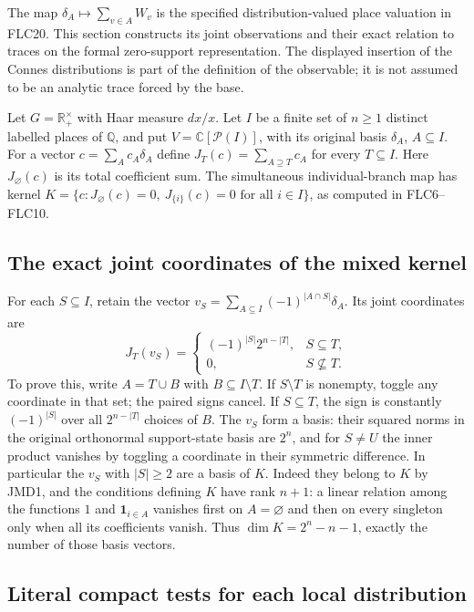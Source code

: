 \documentclass[11pt]{article}
\begin{document}
The map $\delta_A\mapsto\sum_{v\in A}W_v$ is the specified
distribution-valued place valuation in FLC20. This section constructs
its joint observations and their exact relation to traces on the
formal zero-support representation. The displayed insertion of the
Connes distributions is part of the definition of the observable;
it is not assumed to be an analytic trace forced by the base.

Let $G=\mathbb R_+^\times$ with Haar measure $dx/x$.
Let $I$ be a finite set of $n\ge1$ distinct labelled places of
$\mathbb Q$, and put $V=\mathbb C[\mathcal P(I)]$, with its
original basis $\delta_A$, $A\subseteq I$.
For a vector $c=\sum_A c_A\delta_A$ define
$J_T(c)=\sum_{A\supseteq T}c_A$ for every $T\subseteq I$.
Here $J_\varnothing(c)$ is its total coefficient sum.
The simultaneous individual-branch map has kernel
$K=\{c:J_\varnothing(c)=0,\ J_{\{i\}}(c)=0\text{ for all }i\in I\}$,
as computed in FLC6--FLC10.

\subsection{The exact joint coordinates of the mixed kernel}

For each $S\subseteq I$, retain the vector
$v_S=\sum_{A\subseteq I}(-1)^{|A\cap S|}\delta_A$.
Its joint coordinates are
\[
J_T(v_S)=
\begin{cases}
(-1)^{|S|}2^{n-|T|},&S\subseteq T,\\
0,&S\not\subseteq T.
\end{cases}
\tag{JMD1}
\]
To prove this, write $A=T\cup B$ with $B\subseteq I\setminus T$.
If $S\setminus T$ is nonempty, toggle any coordinate in that set;
the paired signs cancel. If $S\subseteq T$, the sign is constantly
$(-1)^{|S|}$ over all $2^{n-|T|}$ choices of $B$.
The $v_S$ form a basis: their squared norms in the original orthonormal
support-state basis are $2^n$, and for $S\ne U$ the inner product
vanishes by toggling a coordinate in their symmetric difference.
In particular the $v_S$ with $|S|\ge2$ are a basis of $K$.
Indeed they belong to $K$ by JMD1, and the conditions defining $K$
have rank $n+1$: a linear relation among the functions $1$ and
$\mathbf1_{i\in A}$ vanishes first on $A=\varnothing$ and then
on every singleton only when all its coefficients vanish.
Thus $\dim K=2^n-n-1$, exactly the number of those basis vectors.

\subsection{Literal compact tests for each local distribution}
\end{document}

